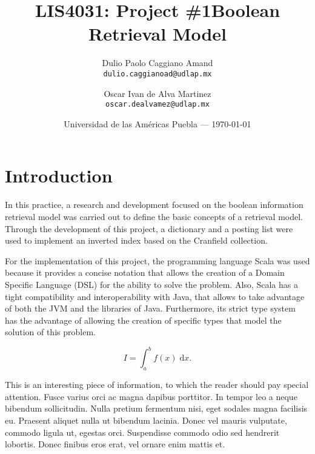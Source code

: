 \documentclass{article}
\title{LIS4031: Project \#1} %
\title{Boolean Retrieval Model} %
\author{Dulio Paolo Caggiano Amand\\ \texttt{dulio.caggianoad@udlap.mx}} %
\author{Oscar Ivan de Alva Martinez\\ \texttt{oscar.dealvamez@udlap.mx}} %
\date{Universidad de las Am\'ericas  Puebla --- \today} %
\begin{document}
\maketitle %


\section*{Introduction} %

In this practice, a research and development focused on the boolean information retrieval model was carried out to define the basic concepts of a retrieval model. Through the development of this project, a dictionary and a posting list were used to implement an inverted index based on the Cranfield collection.

For the implementation of this project, the programming language Scala was used because it provides a concise notation that allows the creation of a Domain Specific Language (DSL) for the ability to solve the problem. Also, Scala has a tight compatibility and interoperability with Java, that allows to take advantage of both the JVM and the libraries of Java. Furthermore, its strict type system has the advantage of allowing the creation of specific types that model the solution of this problem.

\begin{equation}
	I = \int_{a}^{b} f(x) \; \text{d}x.
\end{equation}

\begin{info} %
	This is an interesting piece of information, to which the reader should pay special attention. Fusce varius orci ac magna dapibus porttitor. In tempor leo a neque bibendum sollicitudin. Nulla pretium fermentum nisi, eget sodales magna facilisis eu. Praesent aliquet nulla ut bibendum lacinia. Donec vel mauris vulputate, commodo ligula ut, egestas orci. Suspendisse commodo odio sed hendrerit lobortis. Donec finibus eros erat, vel ornare enim mattis et.
\end{info}

\end{document}
